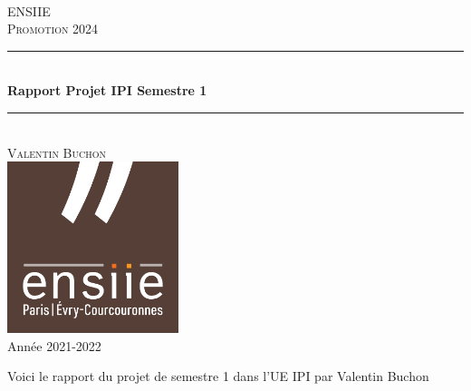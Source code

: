 \documentclass{report}
\begin{document}
\pagestyle{empty}
\begin{center}

    ~ \vfill

    \textsc{\LARGE ENSIIE}\\[1.5cm]
    \textsc{\Large Promotion 2024}\\[0.5cm]

    \rule{\linewidth}{0.5mm} \\[0.4cm]
    {\huge \bfseries Rapport Projet IPI Semestre 1 }\\[0.1cm]
    \rule{\linewidth}{0.5mm} \\[0.4cm]
    \textsc{\large Valentin Buchon}\\[1.5cm]


    \vfill
    \includegraphics[width=5cm]{ENSIIE.png}\\[1cm]
    \vfill
    {\large Année 2021-2022}\\
\end{center}
\newpage
\dominitoc
\tableofcontents
\faketableofcontents

\begin{minipage}{\textwidth}
	Voici le rapport du projet de semestre 1 dans l'UE IPI par Valentin Buchon
\end{minipage}

\newpage

\pagestyle{main}



\newpage
\pagestyle{empty}

\printindex
\end{document}
